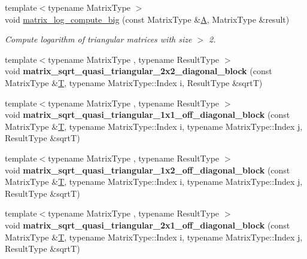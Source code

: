 \begin{DoxyCompactItemize}
\item 
{\footnotesize template$<$typename Matrix\+Type $>$ }\\void \hyperlink{namespace_eigen_1_1internal_ac2de7acbbff34ec236ee5e9fdb2eee38}{matrix\+\_\+log\+\_\+compute\+\_\+big} (const Matrix\+Type \&\hyperlink{group___core___module_class_eigen_1_1_matrix}{A}, Matrix\+Type \&result)
\begin{DoxyCompactList}\small\item\em Compute logarithm of triangular matrices with size $>$ 2. \end{DoxyCompactList}\item 
\mbox{\label{namespace_eigen_1_1internal_a7a96ef1b033a05cde18ea4d933ec62ca}} 
{\footnotesize template$<$typename Matrix\+Type , typename Result\+Type $>$ }\\void {\bfseries matrix\+\_\+sqrt\+\_\+quasi\+\_\+triangular\+\_\+2x2\+\_\+diagonal\+\_\+block} (const Matrix\+Type \&\hyperlink{group___sparse_core___module}{T}, typename Matrix\+Type\+::\+Index i, Result\+Type \&sqrtT)
\item 
\mbox{\label{namespace_eigen_1_1internal_a39b907e48b9b9fed8cea3fbb67c35b54}} 
{\footnotesize template$<$typename Matrix\+Type , typename Result\+Type $>$ }\\void {\bfseries matrix\+\_\+sqrt\+\_\+quasi\+\_\+triangular\+\_\+1x1\+\_\+off\+\_\+diagonal\+\_\+block} (const Matrix\+Type \&\hyperlink{group___sparse_core___module}{T}, typename Matrix\+Type\+::\+Index i, typename Matrix\+Type\+::\+Index j, Result\+Type \&sqrtT)
\item 
\mbox{\label{namespace_eigen_1_1internal_a922345d30d56d13fc20dcc452755ea65}} 
{\footnotesize template$<$typename Matrix\+Type , typename Result\+Type $>$ }\\void {\bfseries matrix\+\_\+sqrt\+\_\+quasi\+\_\+triangular\+\_\+1x2\+\_\+off\+\_\+diagonal\+\_\+block} (const Matrix\+Type \&\hyperlink{group___sparse_core___module}{T}, typename Matrix\+Type\+::\+Index i, typename Matrix\+Type\+::\+Index j, Result\+Type \&sqrtT)
\item 
\mbox{\label{namespace_eigen_1_1internal_acf8f128614be4802a6af9f357da3d169}} 
{\footnotesize template$<$typename Matrix\+Type , typename Result\+Type $>$ }\\void {\bfseries matrix\+\_\+sqrt\+\_\+quasi\+\_\+triangular\+\_\+2x1\+\_\+off\+\_\+diagonal\+\_\+block} (const Matrix\+Type \&\hyperlink{group___sparse_core___module}{T}, typename Matrix\+Type\+::\+Index i, typename Matrix\+Type\+::\+Index j, Result\+Type \&sqrtT)

\end{DoxyCompactItemize}
